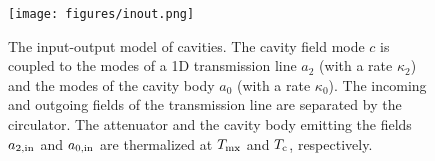 \begin{figure}
    \centering
    \texttt{[image: figures/inout.png]}
    \caption{The input-output model of cavities. The cavity field mode $c$ is 
coupled to the modes of a 1D transmission line $a_2$ (with a rate $\kappa_2$)
 and the modes of the cavity body $a_0$ (with a rate $\kappa_0$). 
The incoming and outgoing fields of the transmission line 
are separated by the circulator. The attenuator and the cavity body emitting 
the fields $a_{2,\rm in}$ and $a_{0,\rm in}$ are thermalized at $T_{\rm mx}$ 
and $T_{\rm c}$, respectively. 
}
    \label{fig:cavity_in_out}
\end{figure}



